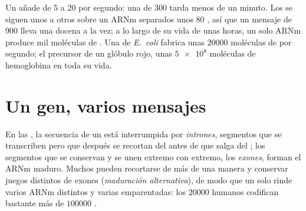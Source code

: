 \begin{example}\label{ex:g11:gene-expression:speed}
Un  añade de 5 a 20  por segundo: una  de
300  tarda menos de un minuto. Los  se siguen unos
a otros sobre un ARNm separados unos 80 , así que un mensaje
de 900  lleva una docena a la vez; a lo largo de su vida de
unas horas, un solo ARNm produce mil moléculas de . Una 
de \emph{E.~coli} fabrica unas $\num{20000}$ moléculas de  por
segundo; el precursor de un glóbulo rojo, unas $\num{5e8}$ moléculas de
hemoglobina en toda su vida.
\end{example}

\section{Un gen, varios mensajes}

\begin{proposition}\label{prop:g11:gene-expression:splicing}
En las , la secuencia de un  está interrumpida por
\emph{intrones}, segmentos que se transcriben pero que
después se recortan del  antes de que salga del ; los
segmentos que se conservan y se unen extremo con extremo, los
\emph{exones}, forman el ARNm maduro. Muchos  pueden recortarse de
más de una manera y conservar juegos distintos de exones
(\emph{maduración alternativa}), de modo que un solo  rinde varios
ARNm distintos y varias  emparentadas: los $\num{20000}$ 
humanos codifican bastante más de $\num{100000}$ .
\end{proposition}
\admitted

